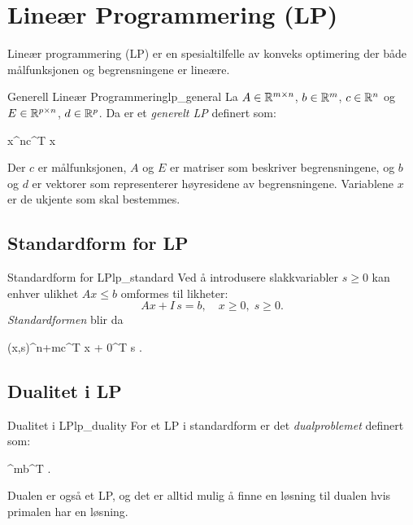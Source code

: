 \section{Lineær Programmering (LP)}
Lineær programmering (LP) er en spesialtilfelle av konveks optimering der både målfunksjonen og begrensningene er lineære.
\begin{definition}{Generell Lineær Programmering}{lp_general}
	La \(A\in\mathbb{R}^{m\times n}\), \(b\in\mathbb{R}^m\), \(c\in\mathbb{R}^n\) og \(E\in\mathbb{R}^{p\times n}\), \(d\in\mathbb{R}^p\).
	Da er et \emph{generelt LP} definert som:
	\begin{mini*}
		{x\in\R^n}{c^T x}{}{}
	\end{mini*}
	Der \(c\) er målfunksjonen, \(A\) og \(E\) er matriser som beskriver begrensningene, og \(b\) og \(d\) er vektorer som representerer høyresidene av begrensningene.
	Variablene \(x\) er de ukjente som skal bestemmes.
\end{definition}

\subsection{Standardform for LP}
\begin{definition}{Standardform for LP}{lp_standard}
	Ved å introdusere slakkvariabler $s\ge0$ kan enhver ulikhet $A x\le b$ omformes til likheter:
	\[
		A x + I\,s = b,\quad x\ge0,\;s\ge0.
	\]
	\emph{Standardformen} blir da
	\begin{mini*}
		{(x,s)\in\R^{n+m}}{c^T x + 0^T s}{}{}
		\addConstraint{[\,A\;\;I\,]\,(x,s)^T}{= b}{}
		\addConstraint{x,s}{\ge0}{}.
	\end{mini*}
\end{definition}

\subsection{Dualitet i LP}
\begin{definition}{Dualitet i LP}{lp_duality}
	For et LP i standardform er det \emph{dualproblemet} definert som:
	\begin{mini*}
		{\lambda\in\R^m}{b^T \lambda}{}{}
		\addConstraint{A^T \lambda}{= c}{}
		\addConstraint{\lambda}{\ge0}{}.
	\end{mini*}
	Dualen er også et LP, og det er alltid mulig å finne en løsning til dualen hvis primalen har en løsning.
\end{definition}

